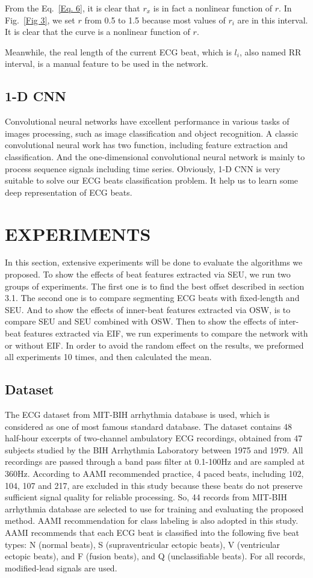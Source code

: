 \documentclass[wcp]{jmlr}
\begin{document}
From the Eq.~\ref{Eq. 6}, it is clear that $r_x$ is in fact a nonlinear function of $r$. In Fig.~\ref{Fig 3}, we set $r$ from 0.5 to 1.5 because most values of $r_i$ are in this interval. It is clear that the curve is a nonlinear function of $r$. 


Meanwhile, the real length of the current ECG beat, which is $l_i$, also named RR interval, is a manual feature to be used in the network.
\subsection{1-D CNN}
Convolutional neural networks have excellent performance in various tasks of images processing, such as image classification and object recognition. A classic convolutional neural work has two function, including feature extraction and classification. And the one-dimensional convolutional neural network is mainly to process sequence signals including time series. Obviously, 1-D CNN is very suitable to solve our ECG beats classification problem. It help us to learn some deep representation of ECG beats.
\section{EXPERIMENTS}
In this section, extensive experiments will be done to evaluate the algorithms we proposed. To show the effects of beat features extracted via SEU, we run two groups of experiments. The first one is to find the best offset described in section 3.1. The second one is to compare segmenting ECG beats with fixed-length and SEU. And to show the effects of inner-beat features extracted via OSW, is to compare SEU and SEU combined with OSW. Then to show the effects of inter-beat features extracted via EIF, we run experiments to compare the network with or without EIF. In order to avoid the random effect on the results, we preformed all experiments 10 times, and then calculated the mean.
\subsection{Dataset}
The ECG dataset from MIT-BIH arrhythmia database is used, which is considered as one of most famous standard database. The dataset contains 48 half-hour excerpts of two-channel ambulatory ECG recordings, obtained from 47 subjects studied by the BIH Arrhythmia Laboratory between 1975 and 1979. All recordings are passed through a band pass filter at 0.1-100Hz and are sampled at 360Hz. According to AAMI recommended practice, 4 paced beats, including 102, 104, 107 and 217, are excluded in this study because these beats do not preserve sufficient signal quality for reliable processing. So, 44 records from MIT-BIH arrhythmia database are selected to use for training and evaluating the proposed method. AAMI recommendation for class labeling is also adopted in this study. AAMI recommends that each ECG beat is classified into the following five beat types: N (normal beats), S (supraventricular ectopic beats), V (ventricular ectopic beats), and F (fusion beats), and Q (unclassifiable beats). For all records, modified-lead \uppercase\expandafter{} signals are used.
\end{document}
